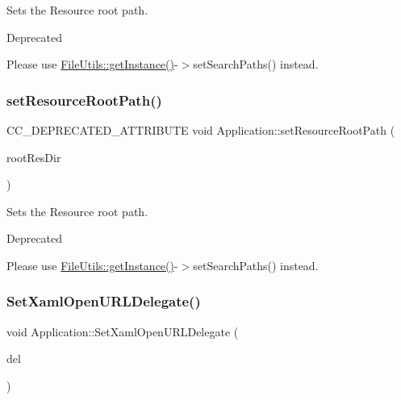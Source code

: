 Sets the Resource root path. \begin{DoxyRefDesc}{Deprecated}
\item[\hyperlink{deprecated__deprecated000358}{Deprecated}]Please use \hyperlink{classFileUtils_ac8ced4394d59f5459445ced27ccd0e8a}{File\+Utils\+::get\+Instance()}-\/$>$set\+Search\+Paths() instead. \end{DoxyRefDesc}
\mbox{\label{classApplication_a0df1abee182d6a9f3d2a318941aace4f}} 
\subsubsection{\texorpdfstring{set\+Resource\+Root\+Path()}{setResourceRootPath()}\hspace{0.1cm}{\footnotesize\ttfamily [8/8]}}
{\footnotesize\ttfamily C\+C\+\_\+\+D\+E\+P\+R\+E\+C\+A\+T\+E\+D\+\_\+\+A\+T\+T\+R\+I\+B\+U\+TE void Application\+::set\+Resource\+Root\+Path (\begin{DoxyParamCaption}\item[{const std\+::string \&}]{root\+Res\+Dir }\end{DoxyParamCaption})}

Sets the Resource root path. \begin{DoxyRefDesc}{Deprecated}
\item[\hyperlink{deprecated__deprecated000123}{Deprecated}]Please use \hyperlink{classFileUtils_ac8ced4394d59f5459445ced27ccd0e8a}{File\+Utils\+::get\+Instance()}-\/$>$set\+Search\+Paths() instead. \end{DoxyRefDesc}
\mbox{\label{classApplication_afb19e7662ff6091856b6fd8aa9255e01}} 
\subsubsection{\texorpdfstring{Set\+Xaml\+Open\+U\+R\+L\+Delegate()}{SetXamlOpenURLDelegate()}}
{\footnotesize\ttfamily void Application\+::\+Set\+Xaml\+Open\+U\+R\+L\+Delegate (\begin{DoxyParamCaption}\item[{const std\+::function$<$ void(\+::Platform\+::\+String$^\wedge$)$>$ \&}]{del }\end{DoxyParamCaption})\hspace{0.3cm}{\ttfamily [inline]}}




